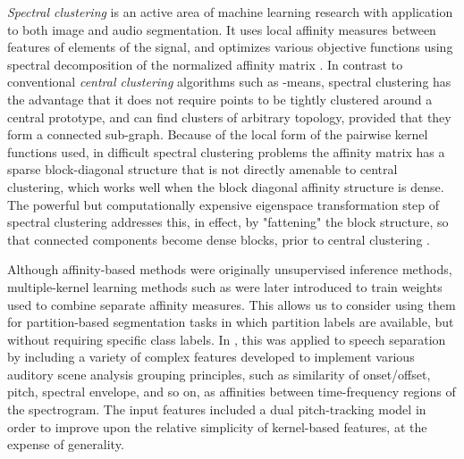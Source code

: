 \documentclass[9pt]{article} \usepackage{nips15submit_e,times}
\begin{document}
\emph{Spectral clustering} is an active area of machine learning research with application to both image and audio segmentation.    It uses local affinity measures between features of elements of the signal,  and optimizes various objective functions using spectral decomposition of the normalized affinity matrix \cite{shi2000normalized}.   In contrast to conventional \emph{central clustering} algorithms such as -means, spectral clustering has the advantage that it does not require points to be tightly clustered around a central prototype, and can find clusters of arbitrary topology, provided that they form a connected sub-graph.  Because of the local form of the pairwise kernel functions used,  in difficult spectral clustering problems the affinity matrix has a sparse block-diagonal structure that is not directly amenable to central clustering, which works well when the block diagonal affinity structure is dense.  The powerful but computationally expensive eigenspace transformation step of spectral clustering addresses this, in effect, by "fattening" the block structure, so that connected components become dense blocks, prior to central clustering \cite{bach2006learning}.  

Although affinity-based methods were originally unsupervised inference methods, multiple-kernel learning methods such as \cite{fowlkes2003learning, bach2006learning} were later introduced to train weights used to combine separate affinity measures.  This allows us to consider using them for partition-based segmentation tasks in which partition labels are available, but  without requiring specific class labels.     In \cite{bach2006learning}, this was applied to speech separation by including a variety of complex features developed to implement various auditory scene analysis grouping principles, such as similarity of onset/offset, pitch, spectral envelope, and so on, as affinities between time-frequency regions of the spectrogram.  The input features included a dual pitch-tracking model in order to improve upon the relative simplicity of kernel-based features, at the expense of generality.
\end{document}
